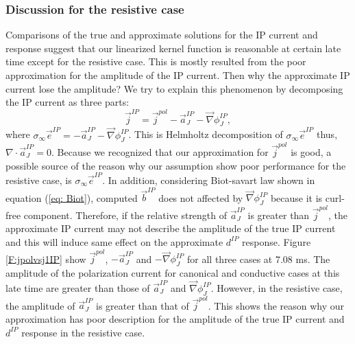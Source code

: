 \documentclass[a4paper, 11pt]{article}
\renewcommand{\div}{\nabla\cdot}
\newcommand{\grad}{\vec \nabla}
\newcommand{\siginf}{\sigma_\infty}
\renewcommand {\j}  { {\vec j} }
\renewcommand {\b}  { {\vec b} }
\newcommand {\e}  { {\vec e} }
\newcommand{\dip}{d^{IP}}
\begin{document}
\subsubsection{Discussion for the resistive case}
Comparisons of the true and approximate solutions for the IP current and response suggest that our linearized kernel function is reasonable at certain late time except for the resistive case. This is mostly resulted from the poor approximation for the amplitude of the IP current. Then why the approximate IP current lose the amplitude? We try to explain this phenomenon by decomposing the IP current as three parts:
\begin{equation}
  \j^{IP} = \j^{pol} -\vec{a}^{IP}_J-\grad \phi^{IP}_J, 
\end{equation}
where $\siginf\e^{IP} = -\vec{a}^{IP}_J - \grad \phi^{IP}_J$. This is Helmholtz decomposition of $\siginf\e^{IP}$ thus, $\div \vec{a}^{IP}_J = 0$. Because we recognized that our approximation for  $\j^{pol}$ is good, a possible source of the reason why our assumption show poor performance for the resistive case, is $\siginf \e^{IP}$. In addition, considering Biot-savart law shown in equation (\ref{eq: Biot}), computed $\b^{IP}$ does not affected by $\grad \phi^{IP}_J$ because it is curl-free component. Therefore, if the relative strength of $\vec{a}^{IP}_J$ is greater than $\j^{pol}$, the approximate IP current may not describe the amplitude of the true IP current and this will induce same effect on the approximate $\dip$ response. Figure \ref{F:jpolvsj1IP} show $\j^{pol}$, $-\vec{a}^{IP}_J$ and $-\grad \phi^{IP}_J$ for all three cases at 7.08 ms. The amplitude of the polarization current for canonical and conductive cases at this late time are greater than those of  $\vec{a}^{IP}_J$ and $\grad \phi^{IP}_J$. However, in the resistive case, the amplitude of $\vec{a}^{IP}_J$ is greater than that of $\j^{pol}$. This shows the reason why our approximation has poor description for the amplitude of the true IP current and $\dip$ response in the resistive case. 
\end{document}
